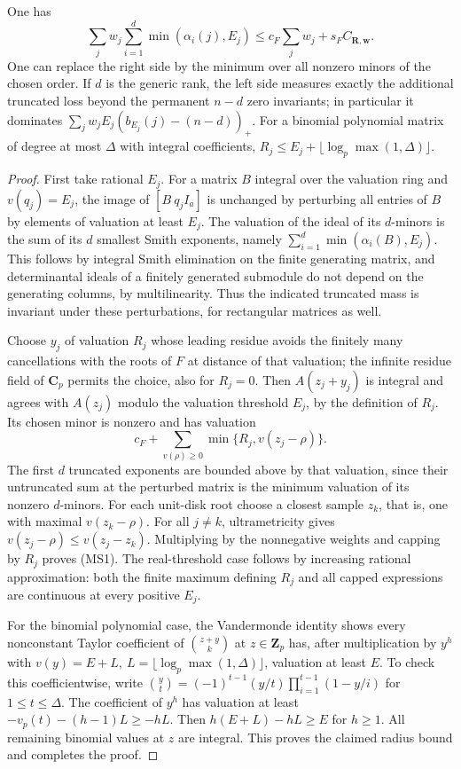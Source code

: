 \begin{theorem}
\label{thm:smith-local-radii}
One has
\[
 \sum_j w_j\sum_{i=1}^d\min(\alpha_i(j),E_j)
 \le c_F\sum_jw_j+s_F C_{\mathbf R,\mathbf w}.             \tag{MS1}
\]
One can replace the right side by the minimum over all nonzero
minors of the chosen order. If \(d\) is the generic rank, the
left side measures exactly the additional truncated loss beyond
the permanent \(n-d\) zero invariants; in particular it dominates
\(\sum_j w_jE_j(b_{E_j}(j)-(n-d))_+\).
For a binomial polynomial matrix of degree at most \(\Delta\) with
integral coefficients, \(R_j\le E_j+\lfloor\log_p\max(1,\Delta)\rfloor\).
\end{theorem}
\begin{proof}
First take rational \(E_j\). For a matrix \(B\) integral over the
valuation ring and \(v(q_j)=E_j\), the image of
\([B\ q_j I_a]\) is unchanged by perturbing all entries of \(B\)
by elements of valuation at least \(E_j\).
The valuation of the ideal of its \(d\)-minors is the sum
of its \(d\) smallest Smith exponents, namely
\(\sum_{i=1}^d\min(\alpha_i(B),E_j)\). This follows by integral
Smith elimination on the finite generating matrix, and
determinantal ideals of a finitely generated submodule do not
depend on the generating columns, by multilinearity.
Thus the indicated truncated mass is invariant under these
perturbations, for rectangular matrices as well.

Choose \(y_j\) of valuation \(R_j\) whose leading residue avoids
the finitely many cancellations with the roots of \(F\) at
distance of that valuation; the infinite residue field of
\(\mathbf C_p\) permits the choice, also for \(R_j=0\).
Then \(A(z_j+y_j)\) is integral and agrees with \(A(z_j)\)
modulo the valuation threshold \(E_j\), by the definition of
\(R_j\). Its chosen minor is nonzero and has valuation
\[
 c_F+\sum_{v(\rho)\ge0}\min\{R_j,v(z_j-\rho)\}.
\]
The first \(d\) truncated exponents are bounded above by
that valuation, since their untruncated sum at the perturbed
matrix is the minimum valuation of its nonzero \(d\)-minors.
For each unit-disk root choose a closest sample \(z_k\),
that is, one with maximal \(v(z_k-\rho)\).
For all \(j\ne k\), ultrametricity gives
\(v(z_j-\rho)\le v(z_j-z_k)\).
Multiplying by the nonnegative weights and capping by \(R_j\)
proves (MS1). The real-threshold case follows by increasing
rational approximation: both the finite maximum defining
\(R_j\) and all capped expressions are continuous at every
positive \(E_j\).

For the binomial polynomial case, the Vandermonde identity
shows every nonconstant Taylor coefficient of \(\binom{z+y}{k}\)
at \(z\in\mathbf Z_p\) has, after multiplication by
\(y^h\) with \(v(y)=E+L,\ L=\lfloor\log_p\max(1,\Delta)\rfloor\),
valuation at least \(E\). To check this coefficientwise,
write \(\binom{y}{t}=(-1)^{t-1}(y/t)
\prod_{i=1}^{t-1}(1-y/i)\) for \(1\le t\le\Delta\).
The coefficient of \(y^h\) has valuation at least
\(-v_p(t)-(h-1)L\ge-hL\).
Then \(h(E+L)-hL\ge E\) for \(h\ge1\).
All remaining binomial values at \(z\) are integral.
This proves the claimed radius bound and completes the proof.
\end{proof}

